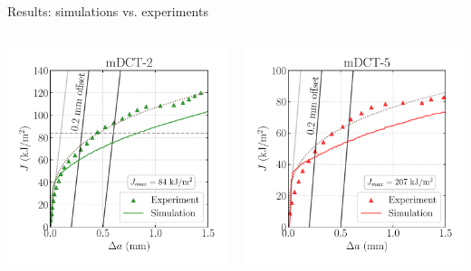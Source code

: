 \documentclass[9pt]{beamer}
\begin{document}
\begin{frame}{Results: simulations vs. experiments}

    \begin{columns}
        \centering
        \includegraphics[width=1.0\textwidth]{Images/plot_J-da_mDCT2_X52.pdf}
        
        \centering
        \includegraphics[width=1.0\textwidth]{Images/plot_J-da_mDCT5_X52.pdf}


\end{columns}
\end{frame}
\end{document}

